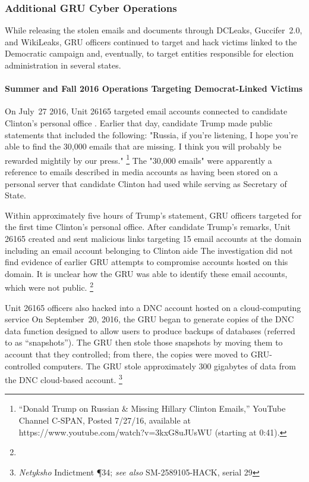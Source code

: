 \subsubsection{Additional GRU Cyber Operations}

While releasing the stolen emails and documents through DCLeaks, Guccifer~2.0, and WikiLeaks, GRU officers continued to target and hack victims linked to the Democratic campaign and, eventually, to target entities responsible for election administration in several states.

\paragraph{Summer and Fall 2016 Operations Targeting Democrat-Linked Victims}

On July~27 2016, Unit 26165 targeted email accounts connected to candidate Clinton's personal office .
Earlier that day, candidate Trump made public statements that included the following: "Russia, if you're listening, I hope you're able to find the 30,000 emails that are missing.
I think you will probably be rewarded mightily by our press."%
\footnote{“Donald Trump on Russian \& Missing Hillary Clinton Emails,” YouTube Channel C-SPAN, Posted 7/27/16, available at https://www.youtube.com/watch?v=3kxG8uJUsWU (starting at 0:41).}
The "30,000 emails" were apparently a reference to emails described in media accounts as having been stored on a personal server that candidate Clinton had used while serving as Secretary of State.

Within approximately five hours of Trump's statement, GRU officers targeted for the first time Clinton's personal office.
After candidate Trump's remarks, Unit 26165 created and sent malicious links targeting 15 email accounts at the domain  including an email account belonging to Clinton aide 
The investigation did not find evidence of earlier GRU attempts to compromise accounts hosted on this domain.
It is unclear how the GRU was able to identify these email accounts, which were not public.%
\footnote{}

Unit 26165 officers also hacked into a DNC account hosted on a cloud-computing service 
On September~20, 2016, the GRU began to generate copies of the DNC data  function designed to allow users to produce backups of databases (referred to  as ``snapshots'').
The GRU then stole those snapshots by moving them to  account that they controlled; from there, the copies were moved to GRU-controlled computers.
The GRU stole approximately 300 gigabytes of data from the DNC cloud-based account.%
\footnote{\textit{Netyksho} Indictment \P 34;
\textit{see also} SM-2589105-HACK, serial 29 }

